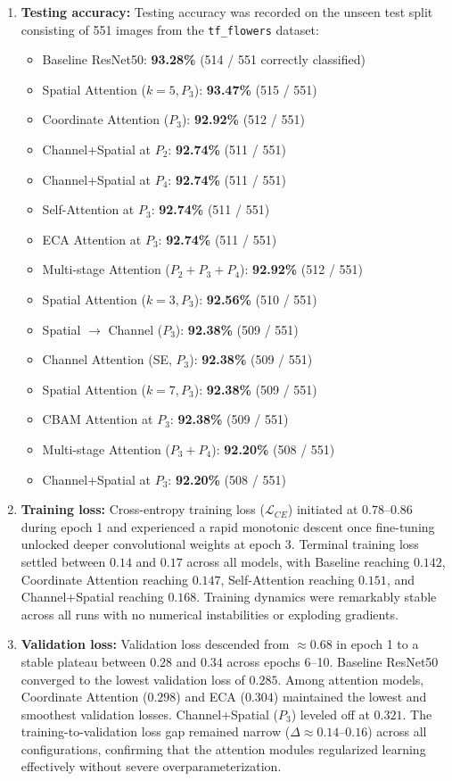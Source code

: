 \documentclass[10pt]{article}
\begin{document}
\begin{enumerate}
\item \textbf{Testing accuracy:}
Testing accuracy was recorded on the unseen test split consisting of 551 images from the \texttt{tf\_flowers} dataset:
\begin{itemize}
\item Baseline ResNet50: \textbf{93.28\%} (514 / 551 correctly classified)
\item Spatial Attention ($k=5, P_3$): \textbf{93.47\%} (515 / 551)
\item Coordinate Attention ($P_3$): \textbf{92.92\%} (512 / 551)
\item Channel+Spatial at $P_2$: \textbf{92.74\%} (511 / 551)
\item Channel+Spatial at $P_4$: \textbf{92.74\%} (511 / 551)
\item Self-Attention at $P_3$: \textbf{92.74\%} (511 / 551)
\item ECA Attention at $P_3$: \textbf{92.74\%} (511 / 551)
\item Multi-stage Attention ($P_2+P_3+P_4$): \textbf{92.92\%} (512 / 551)
\item Spatial Attention ($k=3, P_3$): \textbf{92.56\%} (510 / 551)
\item Spatial $\rightarrow$ Channel ($P_3$): \textbf{92.38\%} (509 / 551)
\item Channel Attention (SE, $P_3$): \textbf{92.38\%} (509 / 551)
\item Spatial Attention ($k=7, P_3$): \textbf{92.38\%} (509 / 551)
\item CBAM Attention at $P_3$: \textbf{92.38\%} (509 / 551)
\item Multi-stage Attention ($P_3+P_4$): \textbf{92.20\%} (508 / 551)
\item Channel+Spatial at $P_3$: \textbf{92.20\%} (508 / 551)
\end{itemize}

\item \textbf{Training loss:}
Cross-entropy training loss ($\mathcal{L}_{CE}$) initiated at $0.78$--$0.86$ during epoch 1 and experienced a rapid monotonic descent once fine-tuning unlocked deeper convolutional weights at epoch 3. Terminal training loss settled between $0.14$ and $0.17$ across all models, with Baseline reaching $0.142$, Coordinate Attention reaching $0.147$, Self-Attention reaching $0.151$, and Channel+Spatial reaching $0.168$. Training dynamics were remarkably stable across all runs with no numerical instabilities or exploding gradients.

\item \textbf{Validation loss:}
Validation loss descended from $\approx 0.68$ in epoch 1 to a stable plateau between $0.28$ and $0.34$ across epochs 6--10. Baseline ResNet50 converged to the lowest validation loss of $0.285$. Among attention models, Coordinate Attention ($0.298$) and ECA ($0.304$) maintained the lowest and smoothest validation losses. Channel+Spatial ($P_3$) leveled off at $0.321$. The training-to-validation loss gap remained narrow ($\Delta \approx 0.14$--$0.16$) across all configurations, confirming that the attention modules regularized learning effectively without severe overparameterization.


\end{enumerate}
\end{document}
